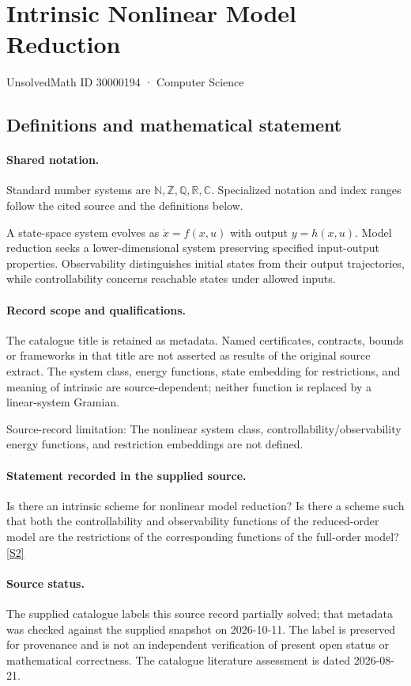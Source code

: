 \documentclass[11pt]{article}
\newcommand{\sref}[2]{\hyperlink{source:#1:#2}{[S#2]}}
\begin{document}
\setcounter{section}{30000193}
\section{Intrinsic Nonlinear Model Reduction}\label{30000194}
{\small\sffamily UnsolvedMath ID 30000194 · Computer Science}
\subsection{Definitions and mathematical statement}

\paragraph{Shared notation.}Standard number systems are $\mathbb N,\mathbb Z,\mathbb Q,\mathbb R,\mathbb C$. Specialized notation and index ranges follow the cited source and the definitions below.


A state-space system evolves as $\dot x=f(x,u)$ with output $y=h(x,u)$. Model reduction seeks a lower-dimensional system preserving specified input-output properties. Observability distinguishes initial states from their output trajectories, while controllability concerns reachable states under allowed inputs.
\paragraph{Record scope and qualifications.}
The catalogue title is retained as metadata. Named certificates, contracts, bounds or frameworks in that title are not asserted as results of the original source extract.
The system class, energy functions, state embedding for restrictions, and meaning of intrinsic are source-dependent; neither function is replaced by a linear-system Gramian.

Source-record limitation: The nonlinear system class, controllability/observability energy functions, and restriction embeddings are not defined.
\paragraph{Statement recorded in the supplied source.}
Is there an intrinsic scheme for nonlinear model reduction? Is there a scheme such that both the controllability and observability functions of the reduced-order model are the restrictions of the corresponding functions of the full-order model? \sref{30000194}{2}
\paragraph{Source status.}
The supplied catalogue labels this source record partially solved; that metadata was checked against the supplied snapshot on 2026-10-11. The label is preserved for provenance and is not an independent verification of present open status or mathematical correctness. The catalogue literature assessment is dated 2026-08-21.
\end{document}
